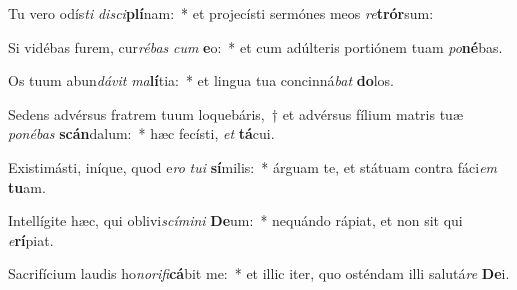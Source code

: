 \item Tu vero odís\textit{ti} \textit{di}\textit{sci}\textbf{plí}nam:~* et projecísti sermónes meos \textit{re}\textbf{trór}sum:
\item Si vidébas furem, cur\textit{ré}\textit{bas} \textit{cum} \textbf{e}o:~* et cum adúlteris portiónem tuam \textit{po}\textbf{né}bas.
\item Os tuum abun\textit{dá}\textit{vit} \textit{ma}\textbf{lí}tia:~* et lingua tua concinná\textit{bat} \textbf{do}los.
\item Sedens advérsus fratrem tuum loquebáris,~† et advérsus fílium matris tuæ \textit{po}\textit{né}\textit{bas} \textbf{scán}dalum:~* hæc fecísti, \textit{et} \textbf{tá}cui.
\item Existimásti, iníque, quod e\textit{ro} \textit{tu}\textit{i} \textbf{sí}milis:~* árguam te, et státuam contra fáci\textit{em} \textbf{tu}am.
\item Intellígite hæc, qui oblivi\textit{scí}\textit{mi}\textit{ni} \textbf{De}um:~* nequándo rápiat, et non sit qui \textit{e}\textbf{rí}piat.
\item Sacrifícium laudis ho\textit{no}\textit{ri}\textit{fi}\textbf{cá}bit me:~* et illic iter, quo osténdam illi salutá\textit{re} \textbf{De}i.
